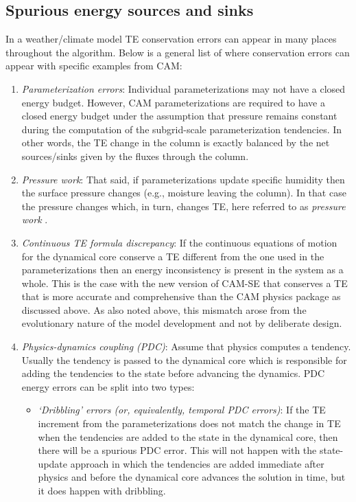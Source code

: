\documentclass{agujournal}
\begin{document}
\subsection{Spurious energy sources and sinks}\label{subsec:spuriousE}
In a weather/climate model TE conservation errors can appear in many places throughout the algorithm. Below is a general list of where conservation errors can appear with specific examples from CAM:
\begin{enumerate}
\item {\em{Parameterization errors}}: Individual parameterizations may not have a closed energy budget. However, CAM parameterizations are required to have a closed energy budget under the assumption that pressure remains constant during the computation of the subgrid-scale parameterization tendencies. In other words, the TE change in the column is exactly balanced by the net sources/sinks given by the fluxes through the column. 
\item {\em{Pressure work}}: That said, if parameterizations update specific humidity then the surface pressure changes (e.g., moisture leaving the column). In that case the pressure changes which, in turn, changes TE, here referred to as {\em{pressure work}} \citep[section 3.1.8 in ][]{CAM5}.
\item {\em{Continuous TE formula discrepancy}}:  If the continuous equations of motion for the dynamical core conserve a TE different from the one used in the parameterizations then an energy inconsistency is present in the system as a whole. This is the case with the new version of CAM-SE that conserves a TE that is more accurate and comprehensive than the CAM physics package as discussed above. As also noted above, this mismatch arose from the evolutionary nature of the model development and not by deliberate design.
\item {\em{Physics-dynamics coupling (PDC)}}: Assume that physics computes a tendency. Usually the tendency is passed to the dynamical core which is responsible for adding the tendencies to the state before advancing the dynamics. PDC energy errors can be split into two types:
\begin{itemize}
\item {\em{`Dribbling' errors (or, equivalently, temporal PDC errors)}}: If the TE increment from the parameterizations does not match the change in TE when the tendencies are added to the state in the dynamical core, then there will be a spurious PDC error. This will not happen with the state-update approach in which the tendencies are added immediate after physics and before the dynamical core advances the solution in time, but it does happen with dribbling. 

\end{itemize}
\end{enumerate}
\end{document}
